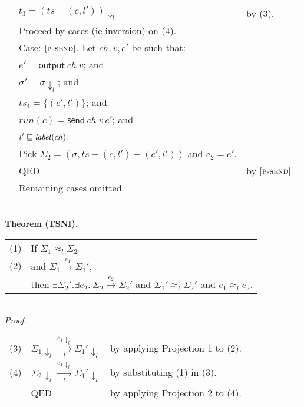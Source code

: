 \documentclass{article}
\newcommand{\rn}[1]{\text{\textsc{[#1]}}}
\newcommand{\ssteparrow}[1]{\overset{#1}{\longrightarrow}}
\newcommand{\sstep}[3]{#2\ssteparrow{#1}#3}
\newcommand{\lssteparrow}[2]{\overset{#2}{\underset{#1}{\longrightarrow}}}
\newcommand{\lsstep}[4]{#3\lssteparrow{#1}{#2}#4}
\newcommand{\s}[1]{\text{\textit{#1}}}
\newcommand{\thread}[2]{(#1,#2)}
\newcommand{\opsend}[3]{\textsf{send}~#1~#2~#3}
\newcommand{\evsend}[2]{\textsf{output}~#1~#2}
\newcommand{\proj}[2]{#1{\downarrow_{#2}}}
\newcommand{\lequiv}[3]{#2\approx_{#1}#3}
\begin{document}
\begin{tabular}{l@{$\qquad$}l@{\qquad}l}
        & $t_3 = \proj{(ts-\thread{c}{l'})}{l}$
        & by (3).
\\
        & Proceed by cases (ie inversion) on (4).
\\
        & Case: $\rn{p-send}$. Let $ch,v,c'$ be such that:
\\
        & \z $e'=\evsend{ch}{v}$; and
\\
        & \z $\sigma'=\proj{\sigma}{l}$; and
\\
        & \z $ts_4=\{\thread{c'}{l'}\}$; and
\\
        & \z $run(c)=\opsend{ch}{v}{c'}$; and
\\
        & \z $l'\sqsubseteq\s{label}(ch)$.
\\
        & \z Pick $\Sigma_2 = (\sigma, ts-\thread{c}{l'}+\thread{c'}{l'})$ and $e_2=e'$.
\\
        & \z QED
        & by $\rn{p-send}$.
\\
        & Remaining cases omitted.
\end{tabular}
\\
\textbf{Theorem (TSNI).}
\\
\begin{tabular}{l@{$\qquad$}l}
  (1) & If $\lequiv{l}{\Sigma_1}{\Sigma_2}$
\\
  (2) & and $\sstep{e_1}{\Sigma_1}{\Sigma_1'}$,
\\
      & then $\exists \Sigma_2'.\exists e_2.~\sstep{e_2}{\Sigma_2}{\Sigma_2'}$
        and $\lequiv{l}{\Sigma_1'}{\Sigma_2'}$
        and $\lequiv{l}{e_1}{e_2}$.
\end{tabular}
\\
\textit{Proof.}
\\
\begin{tabular}{l@{$\qquad$}l@{\qquad}l}
  (3) & $\lsstep{l}{\proj{e_1}{l}}{\proj{\Sigma_1}{l}}{\proj{\Sigma_1'}{l}}$
      & by applying Projection 1 to (2).
\\
  (4) & $\lsstep{l}{\proj{e_1}{l}}{\proj{\Sigma_2}{l}}{\proj{\Sigma_1'}{l}}$
      & by substituting (1) in (3).
\\
      & QED
      & by applying Projection 2 to (4).
\end{tabular}
\end{document}

